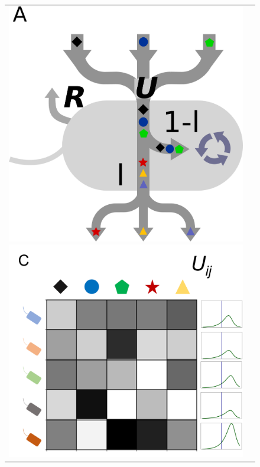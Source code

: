 \documentclass[11pt, a4paper]{article}
\begin{document}
\begin{spacing}{1.5}
\begin{figure}
    \centering
    \begin{tabular}{c@{}c@{}}
    \includegraphics[scale=0.53]{./Figures/Model.png}
    \includegraphics[scale=0.29]{./Figures/U.png}
    \end{tabular}

\end{figure}
\end{spacing}
\end{document}
